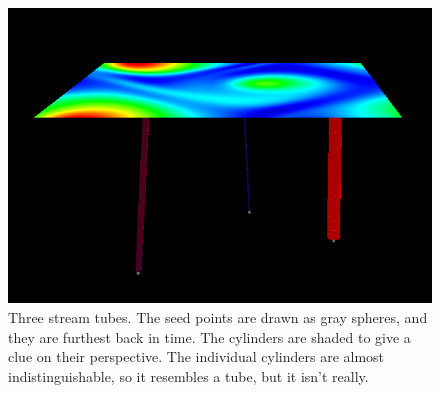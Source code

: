 \begin{figure}[htb]
  \centering
  \includegraphics[width=\linewidth]{./content/pictures/stream_tubes.png}
  \caption{Three stream tubes. The seed points are drawn as gray spheres, and they are furthest back in time. The cylinders are shaded to give a clue on their perspective. The individual cylinders are almost indistinguishable, so it resembles a tube, but it isn't really.}
\end{figure}

\clearpage